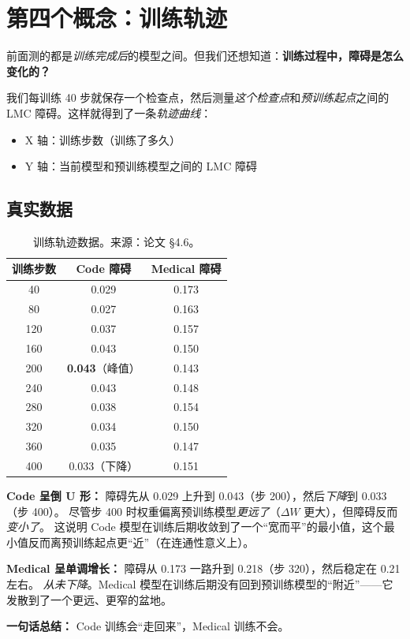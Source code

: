 \documentclass[12pt,a4paper]{ctexart}
\begin{document}
\section{第四个概念：训练轨迹}

\begin{explainbox}
前面测的都是\emph{训练完成后}的模型之间。但我们还想知道：\textbf{训练过程中，障碍是怎么变化的？}

我们每训练 40 步就保存一个检查点，然后测量\emph{这个检查点}和\emph{预训练起点}之间的 LMC 障碍。这样就得到了一条\emph{轨迹曲线}：

\begin{itemize}
  \item X 轴：训练步数（训练了多久）
  \item Y 轴：当前模型和预训练模型之间的 LMC 障碍
\end{itemize}
\end{explainbox}

\subsection*{真实数据}

\begin{table}[H]
\centering
\begin{tabular}{ccc}
\toprule
\textbf{训练步数} & \textbf{Code 障碍} & \textbf{Medical 障碍} \\
\midrule
40  & 0.029 & 0.173 \\
80  & 0.027 & 0.163 \\
120 & 0.037 & 0.157 \\
160 & 0.043 & 0.150 \\
\rowcolor{blue!8}200 & \textbf{0.043}（峰值）& 0.143 \\
240 & 0.043 & 0.148 \\
280 & 0.038 & 0.154 \\
320 & 0.034 & 0.150 \\
360 & 0.035 & 0.147 \\
400 & 0.033（下降）& 0.151 \\
\bottomrule
\end{tabular}
\caption{训练轨迹数据。来源：论文 \S4.6。}
\end{table}

\begin{resultbox}
\textbf{Code 呈倒 U 形：}
障碍先从 0.029 上升到 0.043（步 200），然后\emph{下降}到 0.033（步 400）。
尽管步 400 时权重偏离预训练模型\emph{更远了}（$\Delta W$ 更大），但障碍反而\emph{变小了}。
这说明 Code 模型在训练后期收敛到了一个``宽而平''的最小值，这个最小值反而离预训练起点更``近''（在连通性意义上）。

\textbf{Medical 呈单调增长：}
障碍从 0.173 一路升到 0.218（步 320），然后稳定在 0.21 左右。
\emph{从未下降}。Medical 模型在训练后期没有回到预训练模型的``附近''——它发散到了一个更远、更窄的盆地。

\textbf{一句话总结：}
Code 训练会``走回来''，Medical 训练不会。
\end{resultbox}
\end{document}
